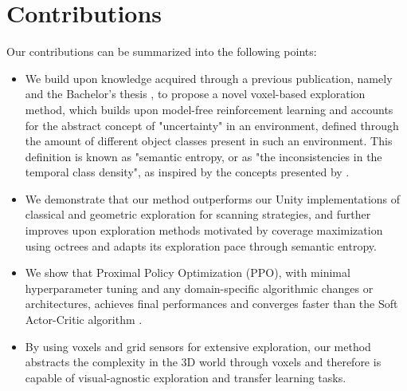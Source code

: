 \section{Contributions}\label{chap:1:contributions}
Our contributions can be summarized into the following points:
\begin{itemize}
    \item We build upon knowledge acquired through a previous publication, namely \textit{} \cite{DBLP:journals/corr/abs-2105-09843} and the Bachelor's thesis \textit{} \cite{dano2020}, to propose a novel voxel-based exploration method, which builds upon model-free
    reinforcement learning
    and accounts for the abstract concept of "uncertainty" in an environment, defined through the amount of different object classes present in such an environment. This definition is known as "semantic entropy, or as "the inconsistencies in the temporal class density", as inspired by the concepts presented by \textcite{chaplot2020semantic}.
    
    \item We demonstrate that our method outperforms our Unity implementations of classical and geometric exploration for scanning strategies, and further improves upon exploration methods motivated by coverage maximization \cite{chen2019learning} using octrees and adapts its exploration pace through semantic entropy.
    
    \item We show that Proximal Policy Optimization (PPO), with minimal hyperparameter tuning and any domain-specific algorithmic changes or architectures, achieves final performances and converges faster than the Soft Actor-Critic algorithm \cite{schulman2017proximal}.
    \item By using voxels and grid sensors for extensive exploration, our method abstracts the complexity in the 3D world through voxels and therefore is capable of visual-agnostic exploration and transfer learning tasks. 
    

\end{itemize}
